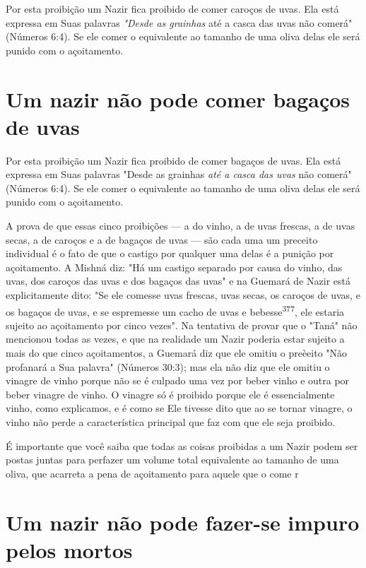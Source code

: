 \begin{itemize}
\begin{enumrate}
\begin{itemize}
\begin{itemize}
\begin{itemize}
Por esta proibição um Nazir fica proibido de comer caroços de uvas. Ela
está expressa em Suas palavras \emph{"Desde as grainhas} até a casca das
uvas não comerá" (Números 6:4). Se ele comer o equivalente ao tamanho de
uma oliva delas ele será punido com o açoitamento.

\section{Um nazir não pode comer bagaços de uvas}

Por esta proibição um Nazir fica proibido de comer bagaços de uvas. Ela
está expressa em Suas palavras "Desde as grainhas \emph{até a casca das
uvas} não comerá" (Números 6:4). Se ele comer o equivalente ao tamanho
de uma oliva delas ele será punido com o açoitamento.

A prova de que essas cinco proibições --- a do vinho, a de uvas
fres­cas, a de uvas secas, a de caroços e a de bagaços de uvas --- são
cada uma um
preceito individual é o fato de que o castigo por qualquer uma delas é a
puni­ção por açoitamento. A Mishná diz: "Há um castigo separado por
causa do vi­nho, das uvas, dos caroços das uvas e dos bagaços das uvas"
e na Guemará de Nazir está explicitamente dito: "Se ele comesse uvas
frescas, uvas secas, os ca­roços de uvas, e os bagaços de uvas, e se
espremesse um cacho de uvas e bebesse\textsuperscript{377}, ele estaria
sujeito ao açoitamento por cinco vezes". Na tentativa de provar que o
"Taná" não mencionou todas as vezes, e que na realidade um Nazir poderia
estar sujeito a mais do que cinco açoitamentos, a Guemará diz que ele
omitiu o preèeito "Não profanará a Sua palavra" (Números 30:3); mas ela
não diz que ele omitiu o vinagre de vinho porque não se é culpado uma
vez por beber vinho e outra por beber vinagre de vinho. O vinagre só é
proibi­do porque ele é essencialmente vinho, como explicamos, e é como
se Ele ti­vesse dito que ao se tornar vinagre, o vinho não perde a
característica principal que faz com que ele seja proibido.

É importante que você saiba que todas as coisas proibidas a um Na­zir
podem ser postas juntas para perfazer um volume total equivalente ao
tama­nho de uma oliva, que acarreta a pena de açoitamento para aquele
que o co­me r

\section{Um nazir não pode fazer-se impuro pelos mortos}


\end{itemize}
\end{itemize}
\end{itemize}
\end{enumrate}
\end{itemize}
